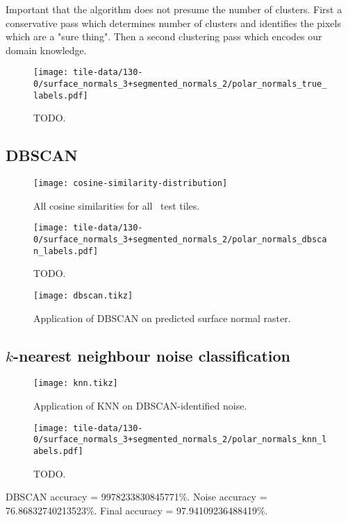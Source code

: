 Important that the algorithm does not presume the number of clusters.
First a conservative pass which determines number of clusters and identifies the pixels which are a "sure thing".
Then a second clustering pass which encodes our domain knowledge.

\begin{wrapfigure}{r}{0.35\textwidth}
  \begin{center}
    \texttt{[image: tile-data/130-0/surface\_normals\_3+segmented\_normals\_2/polar\_normals\_true\_labels.pdf]}
  \end{center}
  \caption{TODO.}%
  \label{fig:polar-normal-true-labels}
\end{wrapfigure}
\lipsum[1-2]

\subsection{DBSCAN}

\begin{figure}[H]
  \centering
  \texttt{[image: cosine-similarity-distribution]}
  \caption{All cosine similarities for all \numtesttiles~test tiles.}
\end{figure}

\begin{wrapfigure}{r}{0.35\textwidth}
  \begin{center}
    \texttt{[image: tile-data/130-0/surface\_normals\_3+segmented\_normals\_2/polar\_normals\_dbscan\_labels.pdf]}
  \end{center}
  \caption{TODO.}%
  \label{fig:polar-normal-dbscan-labels}
\end{wrapfigure}
\lipsum[1-2]

\begin{figure}[H]
  \centering
  \texttt{[image: dbscan.tikz]}
  \caption{Application of DBSCAN on predicted surface normal raster.}
\end{figure}

\subsection{\texorpdfstring{$k$}{k}-nearest neighbour noise classification}

\begin{figure}[H]
  \centering
  \texttt{[image: knn.tikz]}
  \caption{Application of KNN on DBSCAN-identified noise.}
\end{figure}

\newpage
\begin{wrapfigure}{r}{0.35\textwidth}
  \begin{center}
    \texttt{[image: tile-data/130-0/surface\_normals\_3+segmented\_normals\_2/polar\_normals\_knn\_labels.pdf]}
  \end{center}
  \caption{%
    TODO.
  }%
  \label{fig:polar-normal-knn-labels}
\end{wrapfigure}

DBSCAN accuracy = \num{9978233830845771}\%.
Noise accuracy = \num{76.86832740213523}\%.
Final accuracy = \num{97.94109236488419}\%.

\lipsum[1-2]
